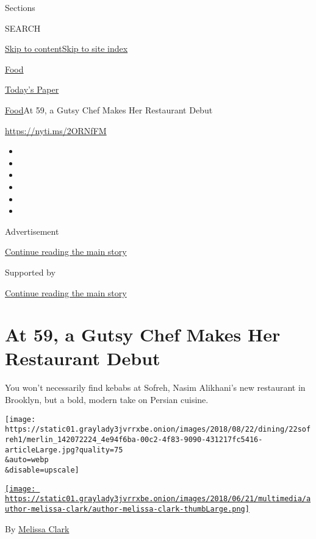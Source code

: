 Sections

SEARCH

\protect\hyperlink{site-content}{Skip to
content}\protect\hyperlink{site-index}{Skip to site index}

\href{https://www.nytimes3xbfgragh.onion/section/food}{Food}

\href{https://myaccount.nytimes3xbfgragh.onion/auth/login?response_type=cookie\&client_id=vi}{}

\href{https://www.nytimes3xbfgragh.onion/section/todayspaper}{Today's
Paper}

\href{/section/food}{Food}\textbar{}At 59, a Gutsy Chef Makes Her
Restaurant Debut

\url{https://nyti.ms/2ORNfFM}

\begin{itemize}
\item
\item
\item
\item
\item
\item
\end{itemize}

Advertisement

\protect\hyperlink{after-top}{Continue reading the main story}

Supported by

\protect\hyperlink{after-sponsor}{Continue reading the main story}

\hypertarget{at-59-a-gutsy-chef-makes-her-restaurant-debut}{%
\section{At 59, a Gutsy Chef Makes Her Restaurant
Debut}\label{at-59-a-gutsy-chef-makes-her-restaurant-debut}}

You won't necessarily find kebabs at Sofreh, Nasim Alikhani's new
restaurant in Brooklyn, but a bold, modern take on Persian cuisine.

\texttt{[image: https://static01.graylady3jvrrxbe.onion/images/2018/08/22/dining/22sofreh1/merlin\_142072224\_4e94f6ba-00c2-4f83-9090-431217fc5416-articleLarge.jpg?quality=75\\\&auto=webp\\\&disable=upscale]}

\href{https://www.nytimes3xbfgragh.onion/by/melissa-clark}{\texttt{[image: https://static01.graylady3jvrrxbe.onion/images/2018/06/21/multimedia/author-melissa-clark/author-melissa-clark-thumbLarge.png]}}

By \href{https://www.nytimes3xbfgragh.onion/by/melissa-clark}{Melissa
Clark}

